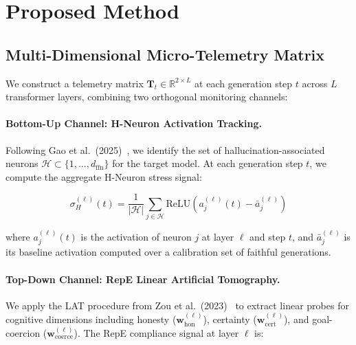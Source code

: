 \documentclass[10pt]{article}
\begin{document}
\section{Proposed Method}

\subsection{Multi-Dimensional Micro-Telemetry Matrix}

We construct a telemetry matrix $\mathbf{T}_t \in \mathbb{R}^{2 \times L}$ at each generation step $t$ across $L$ transformer layers, combining two orthogonal monitoring channels:

\paragraph{Bottom-Up Channel: H-Neuron Activation Tracking.}
Following Gao et al.\ (2025)~\cite{gao2025hneurons}, we identify the set of hallucination-associated neurons $\mathcal{H} \subset \{1, \ldots, d_{\text{ffn}}\}$ for the target model. At each generation step $t$, we compute the aggregate H-Neuron stress signal:

\begin{equation}
\sigma_H^{(\ell)}(t) = \frac{1}{|\mathcal{H}|} \sum_{j \in \mathcal{H}} \text{ReLU}\left(a_j^{(\ell)}(t) - \bar{a}_j^{(\ell)}\right)
\label{eq:hneuron_stress}
\end{equation}

where $a_j^{(\ell)}(t)$ is the activation of neuron $j$ at layer $\ell$ and step $t$, and $\bar{a}_j^{(\ell)}$ is its baseline activation computed over a calibration set of faithful generations.

\paragraph{Top-Down Channel: RepE Linear Artificial Tomography.}
We apply the LAT procedure from Zou et al.\ (2023)~\cite{zou2023repe} to extract linear probes for cognitive dimensions including honesty ($\mathbf{w}_{\text{hon}}^{(\ell)}$), certainty ($\mathbf{w}_{\text{cert}}^{(\ell)}$), and goal-coercion ($\mathbf{w}_{\text{coerce}}^{(\ell)}$). The RepE compliance signal at layer $\ell$ is:
\end{document}
